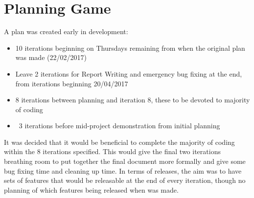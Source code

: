 \section{Planning Game}
A plan was created early in development:
\begin{itemize}
	\item 10 iterations beginning on Thursdays remaining from when the original plan was made (22/02/2017)
	\item Leave 2 iterations for Report Writing and emergency bug fixing at the end, from iterations beginning 20/04/2017
	\item 8 iterations between planning and iteration 8, these to be devoted to majority of coding
	\item ~3 iterations before mid-project demonstration from initial planning
\end{itemize}
It was decided that it would be beneficial to complete the majority of coding within the 8 iterations specified. This would give the final two iterations breathing room to put together the final document more formally and give some bug fixing time and cleaning up time. In terms of releases, the aim was to have sets of features that would be releasable at the end of every iteration, though no planning of which features being released when was made.
\newpage